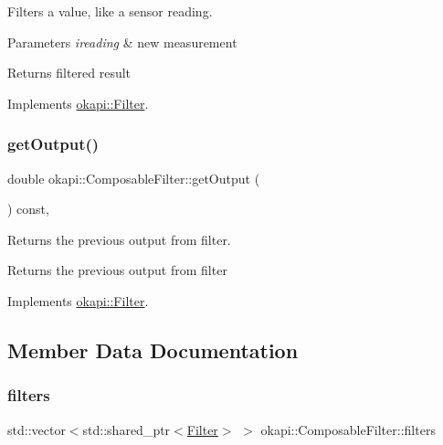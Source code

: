 Filters a value, like a sensor reading.


\begin{DoxyParams}{Parameters}
{\em ireading} & new measurement \\
\hline
\end{DoxyParams}
\begin{DoxyReturn}{Returns}
filtered result 
\end{DoxyReturn}


Implements \mbox{\hyperlink{classokapi_1_1Filter_a7c2ea0b64b37b688900189856d58da15}{okapi\+::\+Filter}}.

\mbox{\label{classokapi_1_1ComposableFilter_a2d54899ce84c463af2f22cfbf36c7c7c}} 
\subsubsection{\texorpdfstring{getOutput()}{getOutput()}}
{\footnotesize\ttfamily double okapi\+::\+Composable\+Filter\+::get\+Output (\begin{DoxyParamCaption}{ }\end{DoxyParamCaption}) const\hspace{0.3cm}{\ttfamily [override]}, {\ttfamily [virtual]}}

Returns the previous output from filter.

\begin{DoxyReturn}{Returns}
the previous output from filter 
\end{DoxyReturn}


Implements \mbox{\hyperlink{classokapi_1_1Filter_a3469cd4bc108f8accf300d9f5cc9f42f}{okapi\+::\+Filter}}.



\subsection{Member Data Documentation}
\mbox{\label{classokapi_1_1ComposableFilter_a83da1d231c702e8db79557a2b458fc90}} 
\subsubsection{\texorpdfstring{filters}{filters}}
{\footnotesize\ttfamily std\+::vector$<$std\+::shared\+\_\+ptr$<$\mbox{\hyperlink{classokapi_1_1Filter}{Filter}}$>$ $>$ okapi\+::\+Composable\+Filter\+::filters\hspace{0.3cm}{\ttfamily [protected]}}

